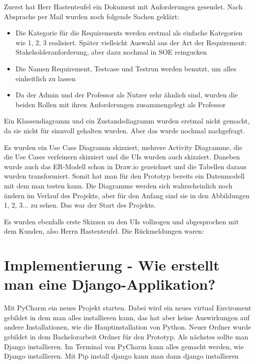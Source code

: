 \documentclass[11pt,a4paper]{report}
\begin{document}
Zuerst hat Herr Hastenteufel ein Dokument mit Anforderungen gesendet. Nach Absprache per Mail wurden noch folgende Sachen geklärt:
\begin{itemize}
\item Die Kategorie für die Requirements werden erstmal als einfache Kategorien wie 1, 2, 3 realisiert. Später vielleicht Auswahl aus der Art der Requirement: Stakeholderanforderung, aber dazu nochmal in SOE reingucken

\item Die Namen Requirement, Testcase und Testrun werden benutzt, um alles einheitlich zu lassen

\item Da der Admin und der Professor als Nutzer sehr ähnlich sind, wurden die beiden Rollen mit ihren Anforderungen zusammengelegt als Professor 
\end{itemize}


Ein Klassendiagramm und ein Zustandsdiagramm wurden erstmal nicht gemacht, da sie nicht für sinnvoll gehalten wurden. Aber das wurde nochmal nachgefragt.

Es wurden ein Use Case Diagramm skizziert, mehrere Activity Diagramme, die die Use Cases verfeinern skizziert und die UIs wurden auch skizziert. Daneben wurde auch das ER-Modell schon in Draw.io gezeichnet und die Tabellen daraus wurden transformiert. Somit hat man für den Prototyp bereits ein Datenmodell mit dem man testen kann. Die Diagramme werden sich wahrscheinlich noch ändern im Verlauf des Projekts, aber für den Anfang sind sie in den Abbildungen 1, 2, 3... zu sehen. Das war der Start des Projekts.

Es wurden ebenfalls erste Skizzen zu den UIs vollzogen und abgesprochen mit dem Kunden, also Herrn Hastenteufel.
Die Rückmeldungen waren:




\chapter{Implementierung - Wie erstellt man eine Django-Applikation?} \label{chap:einf}


Mit PyCharm ein neues Projekt starten. Dabei wird ein neues virtual Enviroment gebildet in dem man alles installieren kann, das hat aber keine Auswirkungen auf andere Installationen, wie die Hauptinstallation von Python. Neuer Ordner wurde gebildet in dem Bachelorarbeit Ordner für den Prototyp. Als nächstes sollte man Django installieren. Im Terminal von PyCharm kann alles gemacht werden, wie Django installieren. Mit Pip install django kann man dann django installieren
\end{document}
